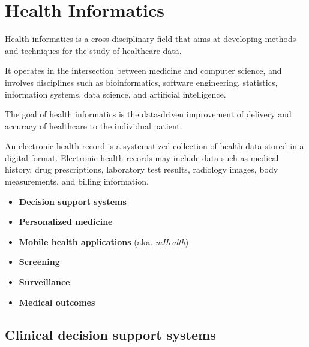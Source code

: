 \chapter{Health Informatics}

Health informatics is a cross-disciplinary field
that aims at developing methods and techniques
for the study of healthcare data.

It operates in the intersection between medicine and computer science,
and involves disciplines such as
bioinformatics, software engineering, statistics, information systems,
data science, and artificial intelligence.

The goal of health informatics is the data-driven improvement
of delivery and accuracy of healthcare to the individual patient.
    
An electronic health record
is a systematized collection of health data 
stored in a digital format.
Electronic health records may include data such as
medical history, drug prescriptions, laboratory test results,
radiology images, body measurements, and billing information.

\begin{itemize}
    \item \textbf{Decision support systems}
    \item \textbf{Personalized medicine}
    \item \textbf{Mobile health applications} (aka. \textit{mHealth})
    \item \textbf{Screening}
    \item \textbf{Surveillance}
    \item \textbf{Medical outcomes}
\end{itemize}


\section{Clinical decision support systems}
